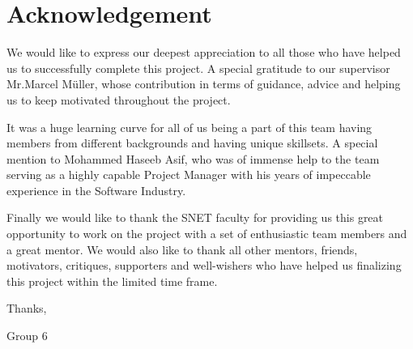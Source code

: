 \chapter*{Acknowledgement}
\label{cha:acknowledgments}
\vspace{20 mm}

We would like to express our deepest appreciation to all those who have helped us to successfully complete this project. A special gratitude to our supervisor Mr.Marcel Müller, whose contribution in terms of guidance, advice and helping us to keep motivated throughout the project. 

It was a huge learning curve for all of us being a part of this team having members from different backgrounds and having unique skillsets. A special mention to Mohammed Haseeb Asif, who was of immense help to the team serving as a highly capable Project Manager with his years of impeccable experience in the Software Industry.

Finally we would like to thank the SNET faculty for providing us this great opportunity to work on the project with a set of enthusiastic team members and a great mentor. We would also like to thank all other mentors, friends, motivators, critiques, supporters and well-wishers who have helped us finalizing this project within the limited time frame. 

\vspace{20 mm}
\noindent Thanks, 
\vspace{2 mm}

\noindent Group 6


